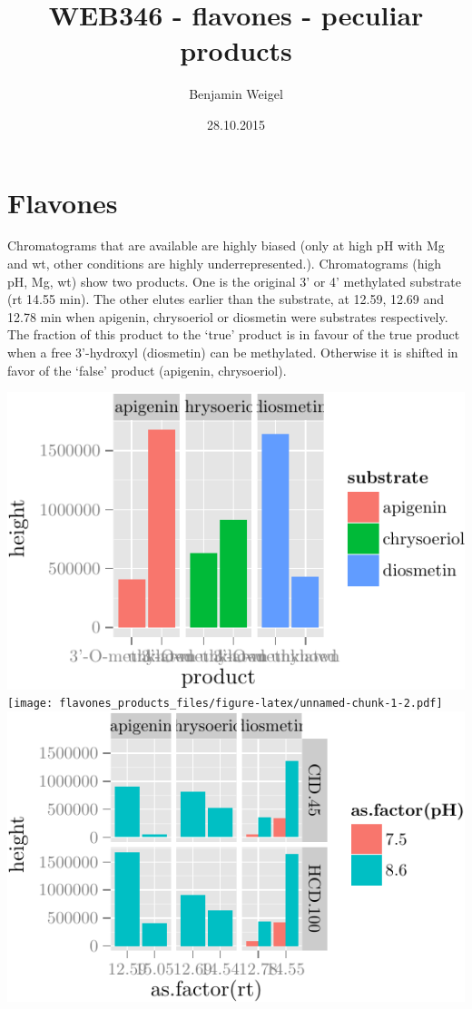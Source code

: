 \documentclass[]{article}
\title{WEB346 - flavones - peculiar products}
\author{Benjamin Weigel}
\date{28.10.2015}
\begin{document}
\maketitle


\section{Flavones}\label{flavones}

Chromatograms that are available are highly biased (only at high pH with
Mg and wt, other conditions are highly underrepresented.). Chromatograms
(high pH, Mg, wt) show two products. One is the original 3' or 4'
methylated substrate (rt 14.55 min). The other elutes earlier than the
substrate, at 12.59, 12.69 and 12.78 min when apigenin, chrysoeriol or
diosmetin were substrates respectively. The fraction of this product to
the `true' product is in favour of the true product when a free
3'-hydroxyl (diosmetin) can be methylated. Otherwise it is shifted in
favor of the `false' product (apigenin, chrysoeriol).

\includegraphics{flavones_products_files/figure-latex/unnamed-chunk-1-1.pdf}
\texttt{[image: flavones\_products\_files/figure-latex/unnamed-chunk-1-2.pdf]}
\includegraphics{flavones_products_files/figure-latex/unnamed-chunk-1-3.pdf}
\end{document}
